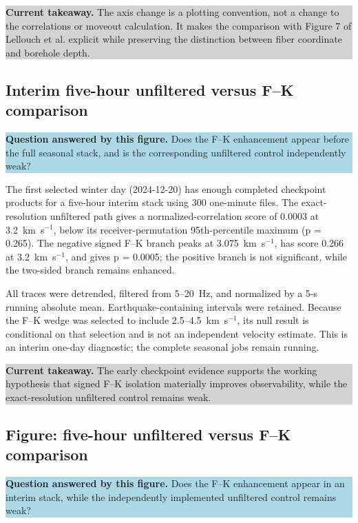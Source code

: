 \documentclass[11pt]{article}
\newcommand{\figquestion}[1]{\par\medskip\noindent\colorbox{lightblue}{\parbox{0.95\linewidth}{\textcolor{questionblue}{\textbf{Question answered by this figure.}} #1}}\par\medskip}
\newcommand{\takeaway}[1]{\par\smallskip\noindent\colorbox{lightgray}{\parbox{0.95\linewidth}{\textbf{Current takeaway.} #1}}\par\medskip}
\begin{document}
\takeaway{The axis change is a plotting convention, not a change to the correlations or moveout calculation. It makes the comparison with Figure 7 of Lellouch et al. explicit while preserving the distinction between fiber coordinate and borehole depth.}


\subsection{Interim five-hour unfiltered versus F--K comparison}
\figquestion{Does the F--K enhancement appear before the full seasonal stack, and is the corresponding unfiltered control independently weak?}

The first selected winter day (2024-12-20) has enough completed checkpoint products for a five-hour interim stack using 300 one-minute files. The exact-resolution unfiltered path gives a normalized-correlation score of 0.0003 at 3.2~km~s$^{-1}$, below its receiver-permutation 95th-percentile maximum (p = 0.265). The negative signed F--K branch peaks at 3.075~km~s$^{-1}$, has score 0.266 at 3.2~km~s$^{-1}$, and gives p = 0.0005; the positive branch is not significant, while the two-sided branch remains enhanced.

All traces were detrended, filtered from 5--20~Hz, and normalized by a 5-s running absolute mean. Earthquake-containing intervals were retained. Because the F--K wedge was selected to include 2.5--4.5~km~s$^{-1}$, its null result is conditional on that selection and is not an independent velocity estimate. This is an interim one-day diagnostic; the complete seasonal jobs remain running.

\takeaway{The early checkpoint evidence supports the working hypothesis that signed F--K isolation materially improves observability, while the exact-resolution unfiltered control remains weak.}


\subsection{Figure: five-hour unfiltered versus F--K comparison}
\figquestion{Does the F--K enhancement appear in an interim stack, while the independently implemented unfiltered control remains weak?}
\end{document}
